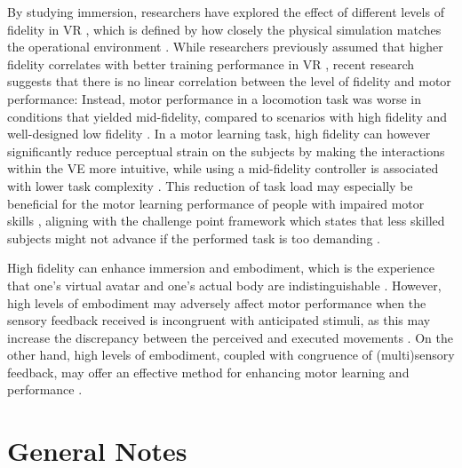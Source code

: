By studying immersion, researchers have explored the effect of different levels of fidelity in VR \cite{Mcmahan2012EvaluatingGame}, which is defined by how closely the physical simulation matches the operational environment \cite{Caird1996PersistentTraining}. 
While researchers previously assumed that higher fidelity correlates with better training performance in VR \cite{Caird1996PersistentTraining, Waller1998TheTraining}, recent research suggests that there is no linear correlation between the level of fidelity and motor performance: Instead, motor performance in a locomotion task was worse in conditions that yielded mid-fidelity, compared to scenarios with high fidelity and well-designed low fidelity \cite{MahdiNabiyouni201520153DUI.}. In a motor learning task, high fidelity can however significantly reduce perceptual strain on the subjects by making the interactions within the VE more intuitive, while using a mid-fidelity controller is associated with lower task complexity \cite{Yang2023TheSimulation}. This reduction of task load may especially be beneficial for the motor learning performance of people with impaired motor skills \cite{Sigrist2013AugmentedReview}, aligning with the challenge point framework which states that less skilled subjects might not advance if the performed task is too demanding \cite{Guadagnoll2004ChallengeLearning}.


High fidelity can enhance immersion and embodiment, which is the experience that one's virtual avatar and one's actual body are indistinguishable \cite{Kilteni2012TheReality}. However, high levels of embodiment may adversely affect motor performance when the sensory feedback received is incongruent with anticipated stimuli, as this may increase the discrepancy between the perceived and executed movements \cite{Odermatt2021CongruencyReality}. 
On the other hand, high levels of embodiment, coupled with congruence of (multi)sensory feedback, may offer an effective method for enhancing motor learning and performance \cite{Odermatt2021CongruencyReality}. 




\section{General Notes}

